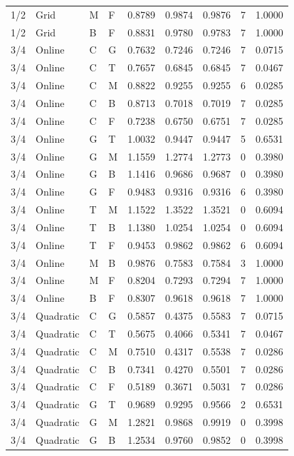 \begin{longtable}{llllrrrrr}
1/2 & Grid & M & F & 0.8789 & 0.9874 & 0.9876 & 7 & 1.0000 \\
1/2 & Grid & B & F & 0.8831 & 0.9780 & 0.9783 & 7 & 1.0000 \\
3/4 & Online & C & G & 0.7632 & 0.7246 & 0.7246 & 7 & 0.0715 \\
3/4 & Online & C & T & 0.7657 & 0.6845 & 0.6845 & 7 & 0.0467 \\
3/4 & Online & C & M & 0.8822 & 0.9255 & 0.9255 & 6 & 0.0285 \\
3/4 & Online & C & B & 0.8713 & 0.7018 & 0.7019 & 7 & 0.0285 \\
3/4 & Online & C & F & 0.7238 & 0.6750 & 0.6751 & 7 & 0.0285 \\
3/4 & Online & G & T & 1.0032 & 0.9447 & 0.9447 & 5 & 0.6531 \\
3/4 & Online & G & M & 1.1559 & 1.2774 & 1.2773 & 0 & 0.3980 \\
3/4 & Online & G & B & 1.1416 & 0.9686 & 0.9687 & 0 & 0.3980 \\
3/4 & Online & G & F & 0.9483 & 0.9316 & 0.9316 & 6 & 0.3980 \\
3/4 & Online & T & M & 1.1522 & 1.3522 & 1.3521 & 0 & 0.6094 \\
3/4 & Online & T & B & 1.1380 & 1.0254 & 1.0254 & 0 & 0.6094 \\
3/4 & Online & T & F & 0.9453 & 0.9862 & 0.9862 & 6 & 0.6094 \\
3/4 & Online & M & B & 0.9876 & 0.7583 & 0.7584 & 3 & 1.0000 \\
3/4 & Online & M & F & 0.8204 & 0.7293 & 0.7294 & 7 & 1.0000 \\
3/4 & Online & B & F & 0.8307 & 0.9618 & 0.9618 & 7 & 1.0000 \\
3/4 & Quadratic & C & G & 0.5857 & 0.4375 & 0.5583 & 7 & 0.0715 \\
3/4 & Quadratic & C & T & 0.5675 & 0.4066 & 0.5341 & 7 & 0.0467 \\
3/4 & Quadratic & C & M & 0.7510 & 0.4317 & 0.5538 & 7 & 0.0286 \\
3/4 & Quadratic & C & B & 0.7341 & 0.4270 & 0.5501 & 7 & 0.0286 \\
3/4 & Quadratic & C & F & 0.5189 & 0.3671 & 0.5031 & 7 & 0.0286 \\
3/4 & Quadratic & G & T & 0.9689 & 0.9295 & 0.9566 & 2 & 0.6531 \\
3/4 & Quadratic & G & M & 1.2821 & 0.9868 & 0.9919 & 0 & 0.3998 \\
3/4 & Quadratic & G & B & 1.2534 & 0.9760 & 0.9852 & 0 & 0.3998 \\

\end{longtable}
